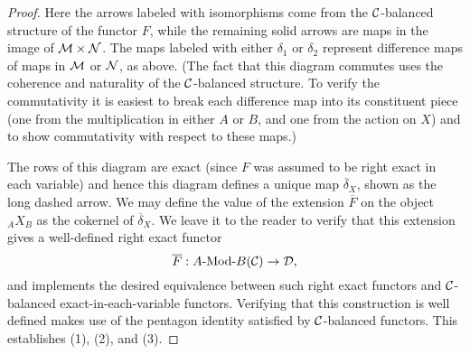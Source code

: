 \documentclass{amsart}
\begin{document}
\begin{proof}
Here the arrows labeled with isomorphisms come from the $\mathcal C$-balanced structure of the functor $F$, while the remaining solid arrows are maps in the image of $\mathcal M \times \mathcal N$. The maps labeled with either $\delta_1$ or $\delta_2$ represent difference maps of maps in $\mathcal M$ or $\mathcal N$, as above.  (The fact that this diagram commutes uses the coherence and naturality of the $\mathcal C$-balanced structure. To verify the commutativity it is easiest to break each difference map into its constituent piece (one from the multiplication in either $A$ or $B$, and one from the action on $X$) and to show commutativity with respect to these maps.)

The rows of this diagram are exact (since $F$ was assumed to be right exact in each variable) and hence this diagram defines a unique map $\overline{\delta}_X$, shown as the long dashed arrow. We may define the value of the extension $\overline{F}$ on the object ${}_AX_B$ as the cokernel of $\overline{\delta}_X$. We leave it to the reader to verify that this extension gives a well-defined right exact functor 
\begin{equation*}
	\overline{F}: \Mod{A}{B}(\cC) \to \cD,
\end{equation*} 
and implements the desired equivalence between such right exact functors and $\mathcal C$-balanced exact-in-each-variable functors. Verifying that this construction is well defined makes use of the pentagon identity satisfied by $\mathcal C$-balanced functors. This establishes (1), (2), and (3). 


\end{proof}
\end{document}
